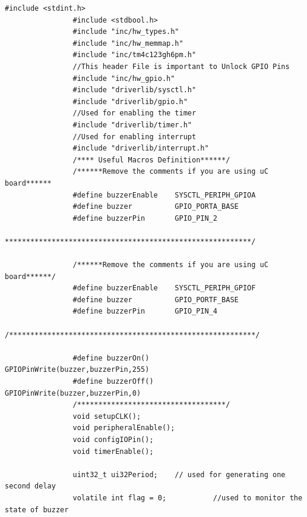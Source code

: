 \documentclass[a4paper,12pt,oneside]{article}
\begin{document}
			\begin{lstlisting}[style=CStyle]
				#include <stdint.h>
				#include <stdbool.h>
				#include "inc/hw_types.h"
				#include "inc/hw_memmap.h"
				#include "inc/tm4c123gh6pm.h"
				//This header File is important to Unlock GPIO Pins
				#include "inc/hw_gpio.h"
				#include "driverlib/sysctl.h"
				#include "driverlib/gpio.h"
				//Used for enabling the timer
				#include "driverlib/timer.h"
				//Used for enabling interrupt
				#include "driverlib/interrupt.h"
				/**** Useful Macros Definition******/
				/******Remove the comments if you are using uC board******
				#define buzzerEnable    SYSCTL_PERIPH_GPIOA
				#define buzzer          GPIO_PORTA_BASE
				#define buzzerPin       GPIO_PIN_2
				**********************************************************/
				
				/******Remove the comments if you are using uC board******/
				#define buzzerEnable    SYSCTL_PERIPH_GPIOF
				#define buzzer          GPIO_PORTF_BASE
				#define buzzerPin       GPIO_PIN_4
				/**********************************************************/
				
				#define buzzerOn()      GPIOPinWrite(buzzer,buzzerPin,255)
				#define buzzerOff()     GPIOPinWrite(buzzer,buzzerPin,0)
				/***********************************/
				void setupCLK();
				void peripheralEnable();
				void configIOPin();
				void timerEnable();
				
				uint32_t ui32Period;    // used for generating one second delay
				volatile int flag = 0;           //used to monitor the state of buzzer
				

\end{lstlisting}
\end{document}
